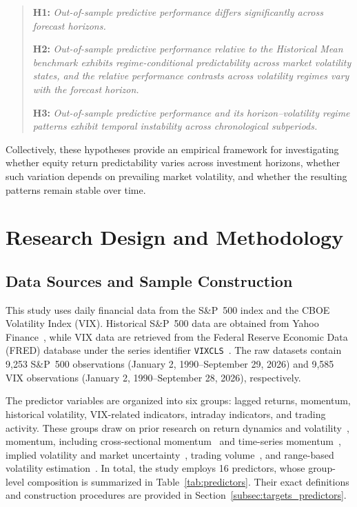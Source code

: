 \documentclass[runningheads,orivec]{llncs}
\begin{document}
\begin{quote}
\noindent\textbf{H1:} \textit{Out-of-sample predictive performance differs significantly across forecast horizons.}

\medskip
\noindent\textbf{H2:} \textit{Out-of-sample predictive performance relative to the Historical Mean benchmark exhibits regime-conditional predictability across market volatility states, and the relative performance contrasts across volatility regimes vary with the forecast horizon.}

\medskip
\noindent\textbf{H3:} \textit{Out-of-sample predictive performance and its horizon--volatility regime patterns exhibit temporal instability across chronological subperiods.}
\end{quote}

Collectively, these hypotheses provide an empirical framework for investigating whether equity return predictability varies across investment horizons, whether such variation depends on prevailing market volatility, and whether the resulting patterns remain stable over time.


\section{Research Design and Methodology}\label{sec:data}

\subsection{Data Sources and Sample Construction}\label{subsec:data_sources}

This study uses daily financial data from the S\&P~500 index and the CBOE Volatility Index (VIX). Historical S\&P~500 data are obtained from Yahoo Finance~\cite{yahoosandp}, while VIX data are retrieved from the Federal Reserve Economic Data (FRED) database under the series identifier \texttt{VIXCLS}~\cite{fredvix}. The raw datasets contain 9,253 S\&P~500 observations (January 2, 1990--September 29, 2026) and 9,585 VIX observations (January 2, 1990--September 28, 2026), respectively.

The predictor variables are organized into six groups: lagged returns, momentum, historical volatility, VIX-related indicators, intraday indicators, and trading activity. These groups draw on prior research on return dynamics and volatility~\cite{french1987}, momentum, including cross-sectional momentum~\cite{jegadeesh1993} and time-series momentum~\cite{moskowitz2012}, implied volatility and market uncertainty~\cite{banerjee2007,bekaert2014}, trading volume~\cite{campbell1993}, and range-based volatility estimation~\cite{alizadeh2002}. In total, the study employs 16 predictors, whose group-level composition is summarized in Table~\ref{tab:predictors}. Their exact definitions and construction procedures are provided in Section~\ref{subsec:targets_predictors}.
\end{document}
